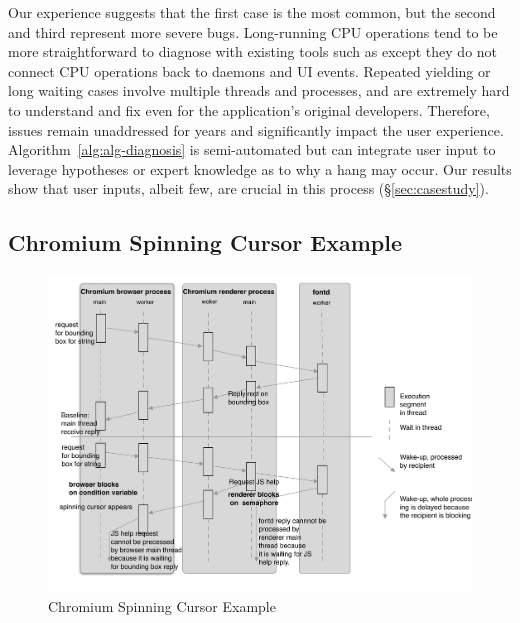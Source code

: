\noindent
Our experience suggests that the first case is the most common, but the
second and third represent more severe bugs. Long-running CPU operations tend to
be more straightforward to diagnose with existing tools such as \spindump except
they do not connect CPU operations back to daemons and UI events. Repeated yielding or
long waiting cases involve multiple threads and processes, and are extremely
hard to understand and fix even for the application's original developers.
Therefore, issues remain unaddressed for years and significantly impact the
user experience. Algorithm~\ref{alg:alg-diagnosis} is semi-automated but can
integrate user input to leverage hypotheses or expert knowledge
as to why a hang may occur. Our results show that user inputs, albeit few, are
crucial in this process (\S\ref{sec:casestudy}).

\subsection{Chromium Spinning Cursor Example}

\begin{figure}[tb]
	\footnotesize
    \centering
	\includegraphics[width=\columnwidth]{./figures/chromium_case_study_2.pdf}
    \caption{Chromium Spinning Cursor Example}
    \label{fig:chromium-case-study}
\end{figure}

